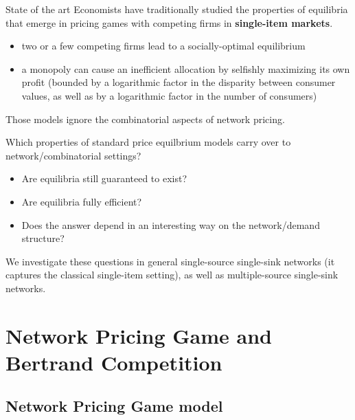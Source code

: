 \documentclass{beamer}
\begin{document}
\begin{frame}{State of the art}
Economists have traditionally studied the properties of equilibria that emerge
in pricing games with competing firms in \textbf{single-item markets}.

\begin{itemize}
\item two or a few competing firms lead to a socially-optimal
equilibrium
\item a monopoly can cause an inefficient allocation
by selfishly maximizing its own profit (bounded by a logarithmic factor in the disparity between
consumer values, as well as by a logarithmic factor in the number of consumers)
\end{itemize}

Those models ignore the combinatorial aspects of network pricing.
\end{frame}


\begin{frame}
Which properties of standard price equilbrium models carry over to network/combinatorial settings?
\begin{itemize}
\item Are equilibria still guaranteed to exist? 
\item Are equilibria fully efficient?
\item Does the answer depend in an interesting way on the network/demand structure?
\end{itemize}

We investigate these questions in general single-source single-sink networks (it captures the classical single-item setting), as well as multiple-source single-sink networks.
\end{frame}



\section{Network Pricing Game and Bertrand Competition}

\subsection{Network Pricing Game model}
\end{document}
